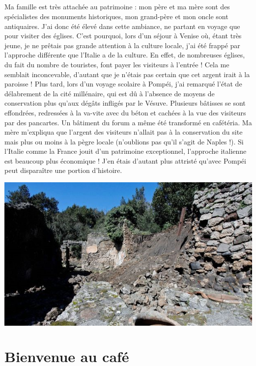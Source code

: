 \paragraph{}
Ma famille est très attachée au patrimoine : mon père et ma mère sont des
spécialistes des monuments historiques, mon grand-père et mon oncle sont
antiquaires. J’ai donc été élevé dans cette ambiance, ne partant en voyage que
pour visiter des églises. C’est pourquoi, lors d’un séjour à Venise où, étant
très jeune, je ne prêtais pas grande attention à la culture locale, j’ai été
frappé par l’approche différente que l’Italie a de la culture. En effet, de
nombreuses églises, du fait du nombre de touristes, font payer les visiteurs à
l’entrée ! Cela me semblait inconcevable, d’autant que je n’étais pas certain
que cet argent irait à la paroisse ! Plus tard, lors d’un voyage scolaire à
Pompéi, j’ai remarqué l’état de délabrement de la cité millénaire, qui est dû à
l’absence de moyens de conservation plus qu’aux dégâts infligés par le Vésuve.
Plusieurs bâtisses se sont effondrées, redressées à la va-vite avec du béton et
cachées à la vue des visiteurs par des pancartes. Un bâtiment du forum a même
été transformé en cafétéria. Ma mère m’expliqua que l’argent des visiteurs
n’allait pas à la conservation du site mais plus ou moins à la pègre locale
(n’oublions pas qu’il s’agit de Naples !). Si l’Italie comme la France jouit
d’un patrimoine exceptionnel, l’approche italienne est beaucoup plus économique
! J’en étais d’autant plus attristé qu’avec Pompéi peut disparaître une portion
d’histoire.

\begin{center}
\includegraphics[scale=0.5]{Pompei.jpg}
\end{center}


\chapter{Bienvenue au café}
